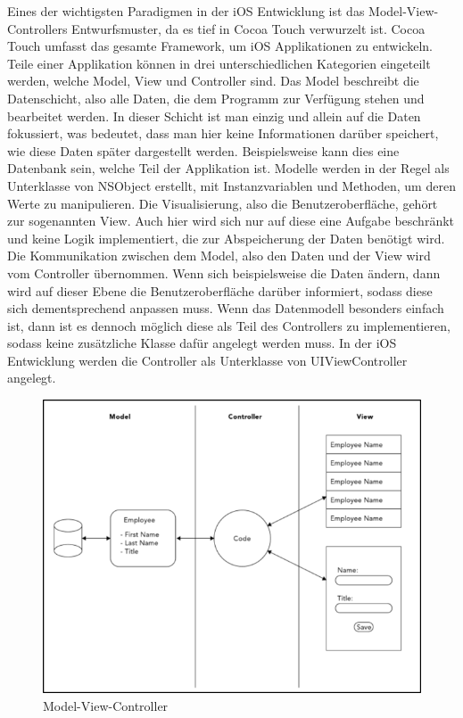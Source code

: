 \documentclass[11pt,a4paper]{report}
\begin{document}
Eines der wichtigsten Paradigmen in der iOS Entwicklung ist das Model-View-Controllers Entwurfsmuster, da es tief in Cocoa Touch verwurzelt ist. Cocoa Touch umfasst das gesamte Framework, um iOS Applikationen zu entwickeln. Teile einer Applikation können in drei unterschiedlichen Kategorien eingeteilt werden, welche Model, View und Controller sind. Das Model beschreibt die Datenschicht, also alle Daten, die dem Programm zur Verfügung stehen und bearbeitet werden. In dieser Schicht ist man einzig und allein auf die Daten fokussiert, was bedeutet, dass man hier keine Informationen darüber speichert, wie diese Daten später dargestellt werden. Beispielsweise kann dies eine Datenbank sein, welche Teil der Applikation ist. Modelle werden in der Regel als Unterklasse von NSObject erstellt, mit Instanzvariablen und Methoden, um deren Werte zu manipulieren. Die Visualisierung, also die Benutzeroberfläche, gehört zur sogenannten View. Auch hier wird sich nur auf diese eine Aufgabe beschränkt und keine Logik implementiert, die zur Abspeicherung der Daten benötigt wird. Die Kommunikation zwischen dem Model, also den Daten und der View wird vom Controller übernommen. Wenn sich beispielsweise die Daten ändern, dann wird auf dieser Ebene die Benutzeroberfläche darüber informiert, sodass diese sich dementsprechend anpassen muss. Wenn das Datenmodell besonders einfach ist, dann ist es dennoch möglich diese als Teil des Controllers zu implementieren, sodass keine zusätzliche Klasse dafür angelegt werden muss. In der iOS Entwicklung werden die Controller als Unterklasse von UIViewController angelegt.
\begin{figure}[h]
\begin{center}
\includegraphics[scale=1.1]{./images/19.png}
\caption{Model-View-Controller \cite{harris2014beginning}}
\label{model_view_controller}
\end{center}
\end{figure}
\end{document}
